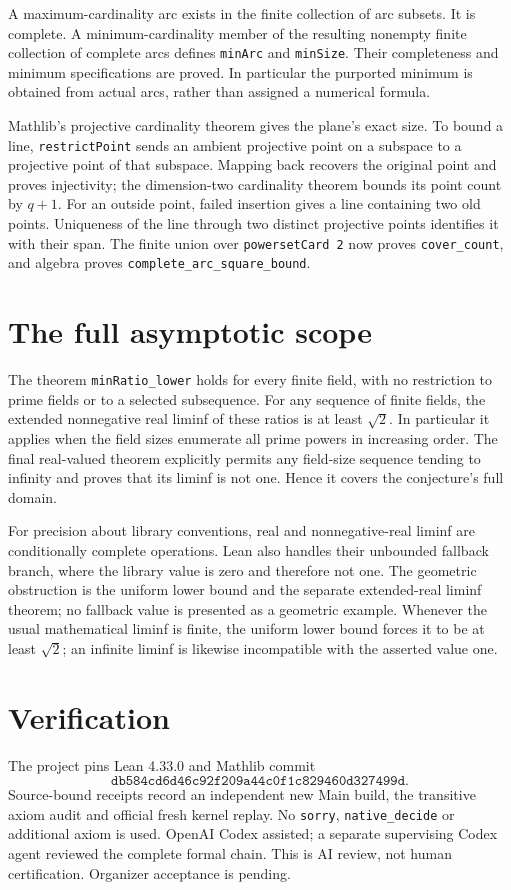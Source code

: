 \documentclass[11pt]{article}
\begin{document}
A maximum-cardinality arc exists in the finite collection of arc
subsets. It is complete. A minimum-cardinality member of the
resulting nonempty finite collection of complete arcs defines
\texttt{minArc} and \texttt{minSize}. Their completeness and
minimum specifications are proved. In particular the purported
minimum is obtained from actual arcs, rather than assigned a
numerical formula.

Mathlib's projective cardinality theorem gives the plane's exact
size. To bound a line, \texttt{restrictPoint} sends an ambient
projective point on a subspace to a projective point of that
subspace. Mapping back recovers the original point and proves
injectivity; the dimension-two cardinality theorem bounds its
point count by $q+1$. For an outside point, failed insertion gives
a line containing two old points. Uniqueness of the line through
two distinct projective points identifies it with their span.
The finite union over \texttt{powersetCard 2} now proves
\texttt{cover\_count}, and algebra proves
\texttt{complete\_arc\_square\_bound}.

\section{The full asymptotic scope}
The theorem \texttt{minRatio\_lower} holds for every finite field,
with no restriction to prime fields or to a selected subsequence.
For any sequence of finite fields, the extended nonnegative real
liminf of these ratios is at least $\sqrt2$. In particular it
applies when the field sizes enumerate all prime powers in
increasing order. The final real-valued theorem explicitly permits
any field-size sequence tending to infinity and proves that its
liminf is not one. Hence it covers the conjecture's full domain.

For precision about library conventions, real and nonnegative-real
liminf are conditionally complete operations. Lean also handles
their unbounded fallback branch, where the library value is zero
and therefore not one. The geometric obstruction is the uniform
lower bound and the separate extended-real liminf theorem; no
fallback value is presented as a geometric example. Whenever the
usual mathematical liminf is finite, the uniform lower bound
forces it to be at least $\sqrt2$; an infinite liminf is likewise
incompatible with the asserted value one.

\section{Verification}
The project pins Lean 4.33.0 and Mathlib commit
\[
\texttt{db584cd6d46c92f209a44c0f1c829460d327499d}.
\]
Source-bound receipts record an independent new Main build, the
transitive axiom audit and official fresh kernel replay. No
\texttt{sorry}, \texttt{native\_decide} or additional axiom is used.
OpenAI Codex assisted; a separate supervising Codex agent reviewed
the complete formal chain. This is AI review, not human certification.
Organizer acceptance is pending.
\end{document}
